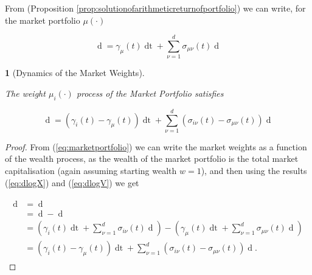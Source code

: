 \documentclass[british]{amsart} \usepackage{lmodern}
\numberwithin{equation}{section} \numberwithin{figure}{section}
\theoremstyle{plain} \newtheorem{thm}{\protect\theoremname}[section]
\theoremstyle{definition} \newtheorem{defn}[thm]{\protect\definitionname}
\theoremstyle{plain} \newtheorem{assumption}[thm]{\protect\assumptionname}
\theoremstyle{plain} \newtheorem{lem}[thm]{\protect\lemmaname}
\theoremstyle{plain} \newtheorem{prop}[thm]{\protect\propositionname}
\theoremstyle{remark} \newtheorem{rem}[thm]{\protect\remarkname}
\theoremstyle{plain} \newtheorem{cor}[thm]{\protect\corollaryname}
\renewcommand{\d}[1]{\mathop{\mathrm{d}{#1}}}
\newcommand{\Vmu}{V^{\mu}}
\begin{document}
From (Proposition \ref{prop:solutionofarithmeticreturnofportfolio}) we can
write, for the market portfolio $\mu(\cdot)$

\begin{equation} 
  \label{eq:dlogV}
  \d{\log{\Vmu}(t)} =  \gamma_{\mu}(t)\d{t} + 
        \sum_{\nu=1}^{d} \sigma_{\mu\nu}(t) \d{W_{\nu}(t)} 
\end{equation}

\begin{prop} [Dynamics of the Market Weights]
  \label{prop:dynamicsofmarketweights}

  The weight $\mu_{i}(\cdot)$ process of the Market Portfolio satisfies 

  \begin{equation} 
    \label{eq:eqmarketportfolioweights}
    \d{\log{\mu_{i}(t)}} = (\gamma_{i}(t) - \gamma_{\mu}(t))\d{t} +
        \sum_{\nu=1}^{d} \left( \sigma_{i\nu}(t) - \sigma_{\mu\nu}(t) \right) \d{W_{\nu}(t)} 
  \end{equation}

\end{prop}

\begin{proof}
  
  From (\ref{eq:marketportfolio}) we can write the market weights as a function
  of the wealth process, as the wealth of the market portfolio is the total market
  capitalisation (again assuming starting wealth $w=1$), and then using the results 
  (\ref{eq:dlogX}) and (\ref{eq:dlogV}) we get

  \begin{gather} 
    \begin{split} 
      \d{\log{\mu_{i}(t)}} 
        &= \d{\log{ \left( \frac{ X_{i}(t) }{ \Vmu(t) } \right)}}  \\
        &= \d{ \log{X_{i}(t)} } - \d{ \log{\Vmu(t)} } \\ 
        &= 
            \left(
              \gamma_{i}(t) \d{t} + \sum_{\nu=1}^{d} \sigma_{i\nu}(t) \d{W_{\nu}(t)}
            \right) -
            \left(
              \gamma_{\mu}(t)\d{t} + \sum_{\nu=1}^{d} \sigma_{\mu\nu}(t) \d{W_{\nu}(t)} 
            \right) \\
        &=
            (\gamma_{i}(t) - \gamma_{\mu}(t))\d{t} +
              \sum_{\nu=1}^{d} 
              \left( 
                \sigma_{i\nu}(t) - \sigma_{\mu\nu}(t) 
              \right) \d{W_{\nu}(t)}. 
    \end{split} 
  \end{gather}

\end{proof}
\end{document}
